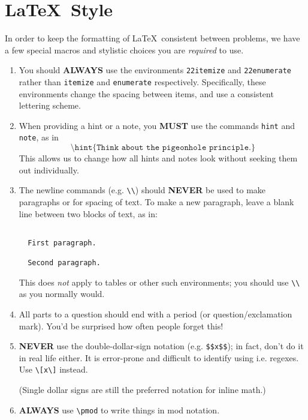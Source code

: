 {
\newcommand\comm[1]{\texttt{\textbackslash #1}}

\section{\LaTeX\ Style}
  In order to keep the formatting of \LaTeX\ consistent between problems, we 
  have a few special macros and stylistic choices you are \textit{required}
  to use.
  
  \begin{enumerate}
    \item You should \textbf{ALWAYS} use the environments \texttt{22itemize} 
      and \texttt{22enumerate} rather than \texttt{itemize} and 
      \texttt{enumerate} respectively. Specifically, these environments 
      change the spacing between items, and use a consistent lettering scheme.
    \item When providing a hint or a note, you \textbf{MUST} use the 
      commands \texttt{hint} and \texttt{note}, as in 
      \[\texttt{\textbackslash hint\{Think about the pigeonhole principle.\}}\] 
      This allows us to change how all hints and notes look without seeking 
      them out individually.
    \item The newline commands (e.g. \texttt{\textbackslash\textbackslash}) 
      should \textbf{NEVER} be used to make paragraphs or for spacing of text. 
      To make a new paragraph, leave a blank line between two blocks of text, 
      as in: 
      \begin{verbatim}

  First paragraph.
  
  Second paragraph.

      \end{verbatim}
      
      This does \textit{not} apply to tables or other such environments; you
      should use \texttt{\textbackslash\textbackslash} as you normally would.
    \item All parts to a question should end with a period 
      (or question/exclamation mark). You'd be surprised how often people 
      forget this!
    \item \textbf{NEVER} use the double-dollar-sign notation 
      (e.g. \texttt{\$\$x\$\$}); in fact, don't do it in real life either. 
      It is error-prone and difficult to identify using i.e. regexes. Use 
      \texttt{\textbackslash[x\textbackslash]} instead.
    
      (Single dollar signs are still the preferred notation for inline math.)
    \item \textbf{ALWAYS} use \comm{pmod} to write things in mod notation. 
      

\end{enumerate}}
